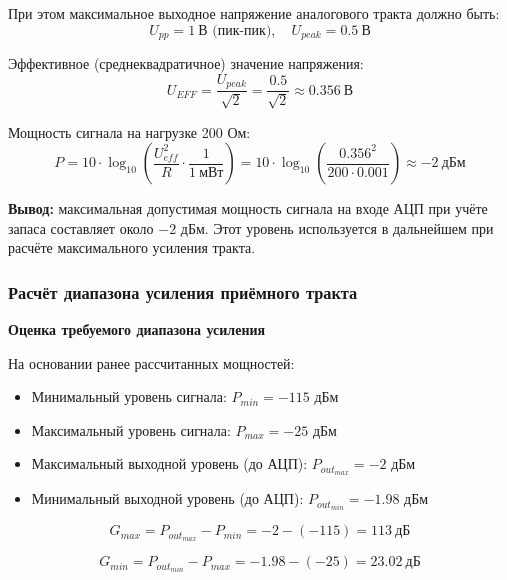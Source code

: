 \documentclass[a4paper,12pt]{article}
\begin{document}
При этом максимальное выходное напряжение аналогового тракта должно быть:
\begin{equation}
U_{pp} = 1\ \text{В (пик-пик)},\quad U_{peak} = 0.5\ \text{В}
\end{equation}

Эффективное (среднеквадратичное) значение напряжения:
\begin{equation}
    U_{EFF} = \frac{U_{peak}}{\sqrt{2}} = \frac{0.5}{\sqrt{2}} \approx 0.356\ \text{В}
\end{equation}

Мощность сигнала на нагрузке 200 Ом:
\begin{equation}
P = 10 \cdot \log_{10} \left( \frac{U_{eff}^2}{R} \cdot \frac{1}{1~\text{мВт}} \right)
= 10 \cdot \log_{10} \left( \frac{0.356^2}{200 \cdot 0.001} \right) \approx -2\ \text{дБм}
\end{equation}

\textbf{Вывод:} максимальная допустимая мощность сигнала на входе АЦП при учёте запаса составляет около $-2$ дБм. Этот уровень используется в дальнейшем при расчёте максимального усиления тракта.


\subsubsection{Расчёт диапазона усиления приёмного тракта}

\textbf{Оценка требуемого диапазона усиления}

На основании ранее рассчитанных мощностей:

\begin{itemize}
\item Минимальный уровень сигнала: $P_{min} = -115$ дБм
\item Максимальный уровень сигнала: $P_{max} = -25$ дБм
\item Максимальный выходной уровень (до АЦП): $P_{out_{max}} = -2$ дБм
\item Минимальный выходной уровень (до АЦП): $P_{out_{min}} = -1.98$ дБм
\end{itemize}

\begin{equation}
G_{max} = P_{out_{max}} - P_{min} = -2 - (-115) = 113\ \text{дБ}
\end{equation}

\begin{equation}
G_{min} = P_{out_{min}} - P_{max} = -1.98 - (-25) = 23.02\ \text{дБ}
\end{equation}
\end{document}
